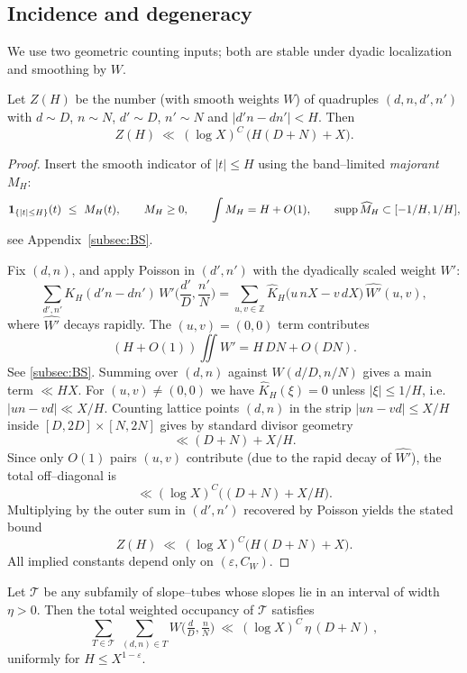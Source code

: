 \subsection{Incidence and degeneracy}\label{subsec:BG.incidence}

We use two geometric counting inputs; both are stable under dyadic localization and smoothing by $W$.

\begin{lemma}\label{lem:BG.incidence}
Let $Z(H)$ be the number (with smooth weights $W$) of quadruples $(d,n,d',n')$ with $d\sim D$, $n\sim N$, $d'\sim D$, $n'\sim N$ and $|d'n-dn'|<H$. Then
\[
Z(H)\ \ll\ (\log X)^C\,\big(H(D+N)+X\big).
\]
\end{lemma}

\begin{proof}
Insert the smooth indicator of $|t|\le H$ using the band–limited \emph{majorant} $M_H$:
\[
\mathbf{1}_{\{|t|\le H\}}(t)\ \le\ M_H(t),\qquad M_H\ge 0,\qquad \int M_H=H+O(1),\qquad \supp\widehat M_H\subset[-1/H,1/H],
\]
see Appendix~\ref{subsec:BS}.

Fix $(d,n)$, and apply Poisson in $(d',n')$ with the dyadically scaled weight $W'$:
\[
\sum_{d',n'} K_H(d'n-dn')\,W'\!\Big(\frac{d'}{D},\frac{n'}{N}\Big)
=\sum_{u,v\in\mathbb{Z}} \widehat K_H\big(u\,nX-v\,dX\big)\,\widehat{W'}(u,v),
\]
where $\widehat{W'}$ decays rapidly. The $(u,v)=(0,0)$ term contributes
\[
(H+O(1))\iint W' = H\,DN+O(DN).
\] See \ref{subsec:BS}.
Summing over $(d,n)$ against $W(d/D,n/N)$ gives a main term $\ll HX$. For $(u,v)\neq(0,0)$ we have $\widehat K_H(\xi)=0$ unless $|\xi|\le 1/H$, i.e. $|un-vd|\ll X/H$. Counting lattice points $(d,n)$ in the strip $|un-vd|\le X/H$ inside $[D,2D]\times[N,2N]$ gives by standard divisor geometry
\[
\ll (D+N)+X/H.
\]
Since only $O(1)$ pairs $(u,v)$ contribute (due to the rapid decay of $\widehat{W'}$), the total off–diagonal is
\[
\ll (\log X)^C\big((D+N)+X/H\big).
\]
Multiplying by the outer sum in $(d',n')$ recovered by Poisson yields the stated bound
\[
Z(H)\ \ll\ (\log X)^C\big(H(D+N)+X\big).
\]
All implied constants depend only on $(\varepsilon,C_W)$. 
\end{proof}


\begin{lemma}\label{lem:BG.degeneracy}
Let $\mathcal T$ be any subfamily of slope–tubes whose slopes lie in an interval of width $\eta>0$. Then the total weighted occupancy of $\mathcal T$ satisfies
\[
\sum_{T\in\mathcal T}\ \sum_{(d,n)\in T} W\!\Big(\tfrac dD,\tfrac nN\Big)
\ \ll\ (\log X)^C\,\eta\,(D+N)\,,
\]
uniformly for $H\le X^{1-\varepsilon}$.
\end{lemma}

